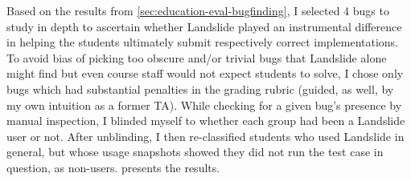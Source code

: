 Based on the results from \cref{sec:education-eval-bugfinding},
I selected 4 bugs to study in depth to ascertain
whether Landslide played an instrumental difference
in helping the students ultimately submit respectively correct implementations.
To avoid bias of picking too obscure and/or trivial bugs
that Landslide alone might find but even course staff would not expect students to solve,
I chose only bugs which had substantial penalties in the grading rubric
(guided, as well, by my own intuition as a former TA).
While checking for a given bug's presence by manual inspection,
I blinded myself to whether each group had been a Landslide user or not.
After unblinding, I then re-classified students who used Landslide in general,
but whose usage snapshots showed they did not run the test case in question,
as non-users.
 presents the results.

